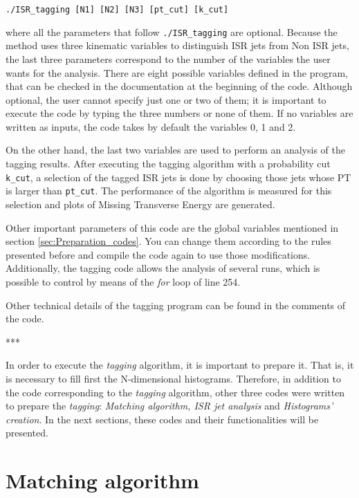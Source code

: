 \documentclass[12pt, oneside]{book}              %
\begin{document}
\texttt{./ISR\_tagging [N1] [N2] [N3] [pt\_cut] [k\_cut]}

\noindent where all the parameters that follow \texttt{./ISR\_tagging} are optional. Because
the method uses three kinematic variables to distinguish ISR jets from Non ISR jets,
the last three parameters correspond to the number of the variables the user wants 
for the analysis. There are eight possible variables defined in the program, that can 
be checked in the documentation at the beginning of the code. Although optional, the 
user cannot specify just one or two of them; it is important to execute the code by 
typing the three numbers or none of them. If no variables are written as inputs,
the code takes by default the variables 0, 1 and 2.

On the other hand, the last two variables are used to perform an analysis of the 
tagging results. After executing the tagging algorithm with a probability cut 
\texttt{k\_cut}, a selection of the tagged ISR jets is done by choosing those jets
whose PT is larger than \texttt{pt\_cut}. The performance of the algorithm is 
measured for this selection and plots of Missing Transverse Energy are generated.

Other important parameters of this code are the global variables mentioned in
section \ref{sec:Preparation_codes}. You can change them according to the
rules presented before and compile the code again to use those modifications.
Additionally, the tagging code allows the analysis of several runs, which
is possible to control by means of the \textit{for} loop of line 254.

Other technical details of the tagging program can be found in the comments of 
the code.


\begin{center}
	***
\end{center}

In order to execute the \textit{tagging} algorithm, it is important to prepare
it. That is, it is necessary to fill first the N-dimensional histograms. Therefore,
in addition to the code corresponding to the \textit{tagging} algorithm, other
three codes were written to prepare the \textit{tagging}: \textit{Matching algorithm,
ISR jet analysis} and \textit{Histograms' creation}. In the next sections,
these codes and their functionalities will be presented.

\section{Matching algorithm}\label{sec:Matching}
\end{document}
